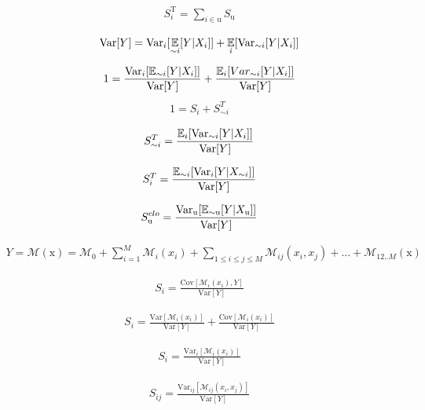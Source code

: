 \begin{align}
S_i^\text{T} = \sum_{i \in \text{u}} S_\text{u}
\end{align}

\begin{align}
\text{Var}[Y] = \text{Var}_i[\operatorname*{\mathbb{E}}_{\sim i}[Y|X_i]] + \operatorname*{\mathbb{E}}_{i}[\text{Var}_{\sim i}[Y|X_i]]
\end{align}

\begin{align}
1 = \frac{\text{Var}_i[\operatorname*{\mathbb{E}}_{\sim i}[Y|X_i]]}{\text{Var}[Y]} + \frac{\operatorname*{\mathbb{E}}_{i}[Var_{\sim i}[Y|X_i]]}{\text{Var}[Y]}
\end{align}
\begin{align}
1 = S_i + S_{\sim i}^T
\end{align}

\begin{align}
S_{\sim i}^T = \frac{\operatorname*{\mathbb{E}}_{i}[\text{Var}_{\sim i}[Y|X_i]]}{\text{Var}[Y]}
\end{align}

\begin{align}
S_{i}^T = \frac{\operatorname*{\mathbb{E}}_{\sim i}[\text{Var}_{i}[Y|X_{\sim i}]]}{\text{Var}[Y]}
\end{align}

\begin{align}
S_\text{u}^{clo} = \frac{\text{Var}_\text{u}[\operatorname*{\mathbb{E}}_{\sim \text{u}}[Y|X_\text{u} ]]}{\text{Var}[Y]}
\end{align}


\begin{align}
Y = \mathcal{M}(\text{x}) = \mathcal{M}_0 + \sum_{i=1}^{M} \mathcal{M}_i(x_i) + \sum_{1 \leq i \leq j \leq M} \mathcal{M}_{ij}(x_i,x_j) + ... + \mathcal{M}_{12..M}(\text{x})
\end{align}

\begin{align}
S_i = \frac{\text{Cov}[\mathcal{M}_i(x_i), Y]}{\text{Var}[Y]}
\end{align}

\begin{align}
S_i = \frac{\text{Var}[\mathcal{M}_i(x_i)]}{\text{Var}[Y]} + \frac{\text{Cov}[\mathcal{M}_i(x_i)]}{\text{Var}[Y]}
\end{align}

\begin{align}
S_i = \frac{\text{Var}_i[\mathcal{M}_i(x_i)]}{\text{Var}[Y]}
\end{align}

\begin{align}
S_{ij} = \frac{\text{Var}_{ij}[\mathcal{M}_{ij}(x_i,x_j)]}{\text{Var}[Y]}
\end{align}

